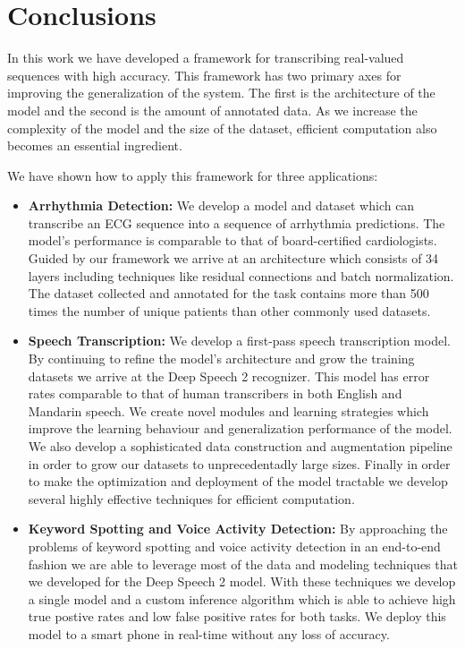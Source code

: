 \chapter{Conclusions}

In this work we have developed a framework for transcribing real-valued
sequences with high accuracy. This framework has two primary axes for improving
the generalization of the system. The first is the architecture of the model
and the second is the amount of annotated data. As we increase the complexity
of the model and the size of the dataset, efficient computation also becomes an
essential ingredient.

We have shown how to apply this framework for three applications:
\begin{itemize}
\item {\bf Arrhythmia Detection:} We develop a model and dataset which can
transcribe an ECG sequence into a sequence of arrhythmia predictions. The
model's performance is comparable to that of board-certified cardiologists.
Guided by our framework we arrive at an architecture which consists of 34
layers including techniques like residual connections and batch normalization.
The dataset collected and annotated for the task contains more than 500 times
the number of unique patients than other commonly used datasets.

\item {\bf Speech Transcription:} We develop a first-pass speech transcription
model. By continuing to refine the model's architecture and grow the training
datasets we arrive at the Deep Speech 2 recognizer. This model has error rates
comparable to that of human transcribers in both English and Mandarin speech.
We create novel modules and learning strategies which improve the learning
behaviour and generalization performance of the model. We also develop a
sophisticated data construction and augmentation pipeline in order to grow our
datasets to unprecedentadly large sizes. Finally in order to make the
optimization and deployment of the model tractable we develop several highly
effective techniques for efficient computation.

\item {\bf Keyword Spotting and Voice Activity Detection:} By approaching the
problems of keyword spotting and voice activity detection in an end-to-end
fashion we are able to leverage most of the data and modeling techniques that
we developed for the Deep Speech 2 model. With these techniques we develop a
single model and a custom inference algorithm which is able to achieve high
true postive rates and low false positive rates for both tasks. We deploy this
model to a smart phone in real-time without any loss of accuracy.

\end{itemize}

